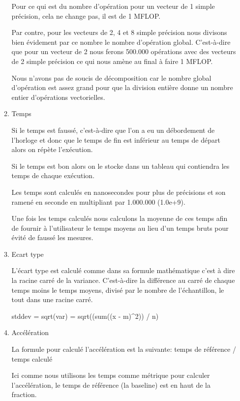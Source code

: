\documentclass[12pt, letterpaper]{article}
\begin{document}
\begin{enumerate}
\begin{enumerate}
Pour ce qui est du nombre d'opération pour un vecteur de 1 simple
précision, cela ne change pas, il est de 1 MFLOP.

Par contre, pour les vecteurs de 2, 4 et 8 simple précision nous divisons
bien évidement par ce nombre le nombre d'opération global. C'est-à-dire
que pour un vecteur de 2 nous ferons 500.000 opérations avec des vecteurs
de 2 simple précision ce qui nous amène au final à faire 1 MFLOP.

Nous n'avons pas de soucis de décomposition car le nombre global
d'opération est assez grand pour que la division entière donne un nombre
entier d'opérations vectorielles.

\item Temps
\label{sec:org0d9e457}

Si le temps est faussé, c'est-à-dire que l'on a eu un débordement de
l'horloge et donc que le temps de fin est inférieur au temps de départ
alors on répète l'exécution.

Si le temps est bon alors on le stocke dans un tableau qui contiendra les
temps de chaque exécution.

Les temps sont calculés en nanosecondes pour plus de précisions et son
ramené en seconde en multipliant par 1.000.000 (1.0e+9).

Une fois les temps calculés nous calculons la moyenne de ces temps afin de
fournir à l'utilisateur le temps moyens au lieu d'un temps bruts pour
évité de faussé les mesures.

\item Ecart type
\label{sec:orgaf21dd3}

L'écart type est calculé comme dans sa formule mathématique c'est à dire
la racine carré de la variance. C'est-à-dire la différence au carré de
chaque temps moins le temps moyens, divisé par le nombre de l'échantillon,
le tout dans une racine carré.

stddev = sqrt(var) = sqrt((sum((x - m)\^{}2)) / n)

\item Accélération
\label{sec:org7feec68}

La formule pour calculé l'accélération est la suivante:
temps de référence / temps calculé

Ici comme nous utilisons les temps comme métrique pour calculer
l'accélération, le temps de référence (la baseline) est en haut de la
fraction.


\end{enumerate}
\end{enumerate}
\end{document}
